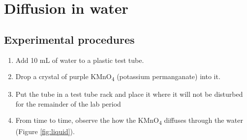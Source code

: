 \documentclass[]{book}
\providecommand{\tightlist}{%
  \setlength{\itemsep}{0pt}\setlength{\parskip}{0pt}}
\begin{document}
\hypertarget{diffusion-in-water}{%
\section{Diffusion in water}\label{diffusion-in-water}}

\hypertarget{experimental-procedures-14}{%
\subsection{Experimental procedures}\label{experimental-procedures-14}}

\begin{enumerate}
\def\labelenumi{\arabic{enumi}.}
\tightlist
\item
  Add 10 mL of water to a plastic test tube.
\item
  Drop a crystal of purple KMnO\textsubscript{4} (potassium permanganate) into it.
\item
  Put the tube in a test tube rack and place it where it will not be disturbed for the remainder of the lab period
\item
  From time to time, observe the how the KMnO\textsubscript{4} diffuses through the water (Figure \ref{fig:liquid}).
\end{enumerate}
\end{document}
